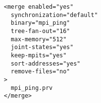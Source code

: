 \begin{verbatim}
<merge enabled="yes" 
  synchronization="default"
  binary="mpi_ping"
  tree-fan-out="16"
  max-memory="512"
  joint-states="yes"
  keep-mpits="yes"
  sort-addresses="yes"
  remove-files="no"
>
  mpi_ping.prv 
</merge>
\end{verbatim}
